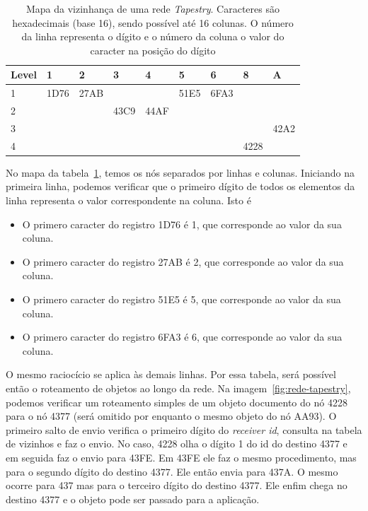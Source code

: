 \begin{table}
	\begin{tabular}{|p{2cm} |p{1cm} |p{1cm} |p{1cm} |p{1cm} |p{1cm} |p{1cm} |p{1cm} |p{1cm}|}
		\hline
		\textbf{Level}	& \textbf{1} & \textbf{2} & \textbf{3}  & \textbf{4}  & \textbf{5}  & \textbf{6} & \textbf{8} & \textbf{A}	\\
		\hline
				1 		& 1D76 		 & 27AB 	  &  			&  			  &		51E5	&	6FA3	 &			  &	            \\
		\hline
				2 		& 	 		 & 		 	  &  43C9		&  	44AF	  &				&			 &			  &	            \\
		\hline
				3 		& 	 		 & 		 	  &  			&  			  &				&			 &			  &	   42A2     \\
		\hline
				4 		& 	 		 & 			  &  			&  			  &				&			 &		4228  &	            \\
		\hline
	\end{tabular}
	\caption{Mapa da vizinhança de uma rede \emph{Tapestry}. Caracteres são hexadecimais (base 16), sendo possível até 16 colunas. O número da linha representa o dígito e o número da coluna o valor do caracter na posição do dígito}
	\label{mapa_vizinhaca_tapestry}
\end{table}

No mapa da tabela~\ref{mapa_vizinhaca_tapestry}, temos os nós separados por linhas e colunas. Iniciando na primeira linha, podemos verificar que o primeiro dígito de todos os elementos da linha representa o valor correspondente na coluna. Isto é
\begin{itemize}
	\item O primero caracter do registro 1D76 é 1, que corresponde ao valor da sua coluna.
	\item O primero caracter do registro 27AB é 2, que corresponde ao valor da sua coluna.
	\item O primero caracter do registro 51E5 é 5, que corresponde ao valor da sua coluna.
	\item O primero caracter do registro 6FA3 é 6, que corresponde ao valor da sua coluna.
\end{itemize}

O mesmo raciocício se aplica às demais linhas. Por essa tabela, será possível então o roteamento de objetos ao longo da rede. Na imagem~\ref{fig:rede-tapestry}, podemos verificar um roteamento simples de um objeto documento do nó 4228 para o nó 4377 (será omitido por enquanto o mesmo objeto do nó AA93). O primeiro salto de envio verifica o primeiro dígito do \emph{receiver id}, consulta na tabela de vizinhos e faz o envio. No caso, 4228 olha o dígito 1 do id do destino 4377 e em seguida faz o envio para 43FE. Em 43FE ele faz o mesmo procedimento, mas para o segundo dígito do destino 4377. Ele então envia para 437A. O mesmo ocorre para 437 mas para o terceiro dígito do destino 4377. Ele enfim chega no destino 4377 e o objeto pode ser passado para a aplicação.

